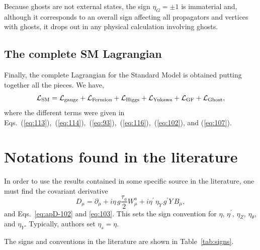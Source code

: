 \documentclass{ws-ijmpa}
\begin{document}
Because ghosts are not external states,
the sign $\eta_G = \pm 1$ is immaterial and,
although it corresponds to an overall sign
affecting all propagators and vertices with ghosts,
it drops out in any physical calculation involving ghosts.


\subsection{The complete SM Lagrangian}

Finally,
the complete Lagrangian for the Standard Model is obtained
putting together all the pieces. We have,
%
\begin{equation}
  \label{eq:117}
  \mathcal{L}_{\rm SM}= \mathcal{L}_{\rm gauge} +\mathcal{L}_{\rm
    Fermion} + \mathcal{L}_{\rm Higgs} + \mathcal{L}_{\rm Yukawa} + 
\mathcal{L}_{\rm GF}+ \mathcal{L}_{\rm Ghost} ,
\end{equation}
%
where the different terms were given in
Eqs.~(\ref{eq:113}),~(\ref{eq:114}),~(\ref{eq:93}),~(\ref{eq:116}),~(\ref{eq:102}),
and (\ref{eq:107}).   




\section{\label{sec:compare}Notations found in the literature}

In order to use the results contained in some specific source in the literature,
one must find the covariant derivative
%
\begin{equation}
D_\mu =
\partial_\mu
+ i \eta\, g \frac{\tau_a}{2} W_\mu^a
+ i \eta^\prime\, \eta_Y\, g^\prime Y\, B_\mu,
\label{Dmu}
\end{equation}
%
and Eqs.~\eqref{eq:apD-102} and \eqref{eq:103}.
This sets the sign convention for $\eta$,
$\eta^\prime$,
$\eta_Z$,
$\eta_\theta$,
and $\eta_Y$.
Typically, authors set $\eta_s=\eta$.

The signs and conventions in the literature are shown in Table~\ref{tab:signs}.
\end{document}

